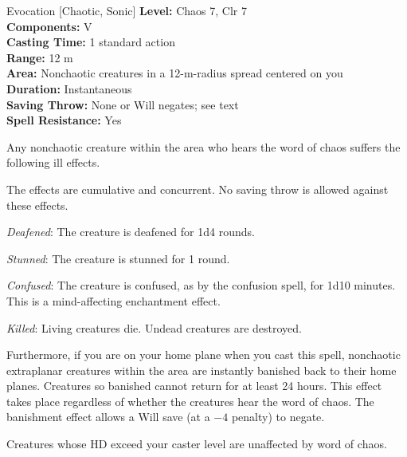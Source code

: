{Evocation [Chaotic, Sonic]}
{
	\textbf{Level:}
	Chaos 7, Clr 7\\
	\textbf{Components:}
	V\\
	\textbf{Casting Time:}
	1 standard action\\
	\textbf{Range:}
	12 m\\
	\textbf{Area:}
	Nonchaotic creatures in a 12-m-radius spread centered on you\\
	\textbf{Duration:}
	Instantaneous\\
	\textbf{Saving Throw:}
	None or Will negates; see text\\
	\textbf{Spell Resistance:}
	Yes\\
}
{
	Any nonchaotic creature within the area who hears the word of chaos suffers the following ill effects.

	The effects are cumulative and concurrent. No saving throw is allowed against these effects.


	\textit{Deafened}:
	The creature is deafened for 1d4 rounds.

	\textit{Stunned}:
	The creature is stunned for 1 round.

	\textit{Confused}:
	The creature is confused, as by the confusion spell, for 1d10 minutes. This is a mind-affecting enchantment effect.

	\textit{Killed}:
	Living creatures die. Undead creatures are destroyed.

	Furthermore, if you are on your home plane when you cast this spell, nonchaotic extraplanar creatures within the area are instantly banished back to their home planes. Creatures so banished cannot return for at least 24 hours. This effect takes place regardless of whether the creatures hear the word of chaos. The banishment effect allows a Will save (at a $-4$ penalty) to negate.

	Creatures whose HD exceed your caster level are unaffected by word of chaos.

}
